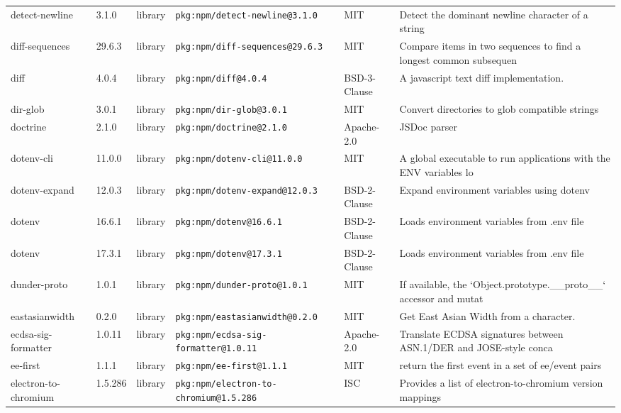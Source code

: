 \documentclass[11pt,a4paper]{article}
\begin{document}
\begin{longtable}{|p{4cm}|p{2cm}|p{1.6cm}|p{5cm}|p{1.5cm}|p{3.5cm}|}
\raggedright detect-newline & 3.1.0 & library & \small\texttt{pkg:npm/detect-newline@3.1.0} & MIT & \small Detect the dominant newline character of a string \\
\raggedright diff-sequences & 29.6.3 & library & \small\texttt{pkg:npm/diff-sequences@29.6.3} & MIT & \small Compare items in two sequences to find a longest common subsequen \\
\raggedright diff & 4.0.4 & library & \small\texttt{pkg:npm/diff@4.0.4} & BSD-3-Clause & \small A javascript text diff implementation. \\
\raggedright dir-glob & 3.0.1 & library & \small\texttt{pkg:npm/dir-glob@3.0.1} & MIT & \small Convert directories to glob compatible strings \\
\raggedright doctrine & 2.1.0 & library & \small\texttt{pkg:npm/doctrine@2.1.0} & Apache-2.0 & \small JSDoc parser \\
\raggedright dotenv-cli & 11.0.0 & library & \small\texttt{pkg:npm/dotenv-cli@11.0.0} & MIT & \small A global executable to run applications with the ENV variables lo \\
\raggedright dotenv-expand & 12.0.3 & library & \small\texttt{pkg:npm/dotenv-expand@12.0.3} & BSD-2-Clause & \small Expand environment variables using dotenv \\
\raggedright dotenv & 16.6.1 & library & \small\texttt{pkg:npm/dotenv@16.6.1} & BSD-2-Clause & \small Loads environment variables from .env file \\
\raggedright dotenv & 17.3.1 & library & \small\texttt{pkg:npm/dotenv@17.3.1} & BSD-2-Clause & \small Loads environment variables from .env file \\
\raggedright dunder-proto & 1.0.1 & library & \small\texttt{pkg:npm/dunder-proto@1.0.1} & MIT & \small If available, the `Object.prototype.\_\_proto\_\_` accessor and mutat \\
\raggedright eastasianwidth & 0.2.0 & library & \small\texttt{pkg:npm/eastasianwidth@0.2.0} & MIT & \small Get East Asian Width from a character. \\
\raggedright ecdsa-sig-formatter & 1.0.11 & library & \small\texttt{pkg:npm/ecdsa-sig-formatter@1.0.11} & Apache-2.0 & \small Translate ECDSA signatures between ASN.1/DER and JOSE-style conca \\
\raggedright ee-first & 1.1.1 & library & \small\texttt{pkg:npm/ee-first@1.1.1} & MIT & \small return the first event in a set of ee/event pairs \\
\raggedright electron-to-chromium & 1.5.286 & library & \small\texttt{pkg:npm/electron-to-chromium@1.5.286} & ISC & \small Provides a list of electron-to-chromium version mappings \\

\end{longtable}
\end{document}
